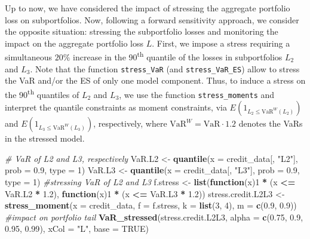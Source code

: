 \documentclass[
]{article}
\newenvironment{Shaded}{\begin{snugshade}}{\end{snugshade}}
\newcommand{\CommentTok}[1]{\textcolor[rgb]{0.56,0.35,0.01}{\textit{#1}}}
\newcommand{\ControlFlowTok}[1]{\textcolor[rgb]{0.13,0.29,0.53}{\textbf{#1}}}
\newcommand{\DataTypeTok}[1]{\textcolor[rgb]{0.13,0.29,0.53}{#1}}
\newcommand{\DecValTok}[1]{\textcolor[rgb]{0.00,0.00,0.81}{#1}}
\newcommand{\FloatTok}[1]{\textcolor[rgb]{0.00,0.00,0.81}{#1}}
\newcommand{\KeywordTok}[1]{\textcolor[rgb]{0.13,0.29,0.53}{\textbf{#1}}}
\newcommand{\NormalTok}[1]{#1}
\newcommand{\OperatorTok}[1]{\textcolor[rgb]{0.81,0.36,0.00}{\textbf{#1}}}
\newcommand{\OtherTok}[1]{\textcolor[rgb]{0.56,0.35,0.01}{#1}}
\newcommand{\StringTok}[1]{\textcolor[rgb]{0.31,0.60,0.02}{#1}}
\begin{document}
Up to now, we have considered the impact of stressing the aggregate portfolio loss on subportfolios. Now, following a forward sensitivity approach, we consider the opposite situation: stressing the subportfolio losses and monitoring the impact on the aggregate portfolio loss \(L\). First, we impose a stress requiring a simultaneous \(20\%\) increase in the 90\textsuperscript{th} quantile of the losses in subportfolios \(L_2\) and \(L_3\). Note that the function \texttt{stress\_VaR} (and \texttt{stress\_VaR\_ES}) allow to stress the VaR and/or the ES of only one model component. Thus, to induce a stress on the 90\textsuperscript{th} quantiles of \(L_2\) and \(L_3\), we use the function \texttt{stress\_moments} and interpret the quantile constraints as moment constraints, via \(E(1_{L_2 \leq \text{VaR}^W(L_2)})\) and \(E(1_{L_3 \leq \text{VaR}^W(L_3)})\), respectively, where \(\text{VaR}^W = \text{VaR} \cdot 1.2\) denotes the VaRs in the stressed model.

\begin{Shaded}
\begin{Highlighting}[]
\CommentTok{# VaR of L2 and L3, respectively}
\NormalTok{VaR.L2 <-}\StringTok{ }\KeywordTok{quantile}\NormalTok{(}\DataTypeTok{x =}\NormalTok{ credit_data[, }\StringTok{"L2"}\NormalTok{], }\DataTypeTok{prob =} \FloatTok{0.9}\NormalTok{, }\DataTypeTok{type =} \DecValTok{1}\NormalTok{) }
\NormalTok{VaR.L3 <-}\StringTok{ }\KeywordTok{quantile}\NormalTok{(}\DataTypeTok{x =}\NormalTok{ credit_data[, }\StringTok{"L3"}\NormalTok{], }\DataTypeTok{prob =} \FloatTok{0.9}\NormalTok{, }\DataTypeTok{type =} \DecValTok{1}\NormalTok{) }
\CommentTok{#stressing VaR of L2 and L3}
\NormalTok{f.stress <-}\StringTok{ }\KeywordTok{list}\NormalTok{(}\ControlFlowTok{function}\NormalTok{(x)}\DecValTok{1} \OperatorTok{*}\StringTok{ }\NormalTok{(x }\OperatorTok{<=}\StringTok{ }\NormalTok{VaR.L2 }\OperatorTok{*}\StringTok{ }\FloatTok{1.2}\NormalTok{), }
                 \ControlFlowTok{function}\NormalTok{(x)}\DecValTok{1} \OperatorTok{*}\StringTok{ }\NormalTok{(x }\OperatorTok{<=}\StringTok{ }\NormalTok{VaR.L3 }\OperatorTok{*}\StringTok{ }\FloatTok{1.2}\NormalTok{)) }
\NormalTok{stress.credit.L2L3 <-}\StringTok{ }\KeywordTok{stress_moment}\NormalTok{(}\DataTypeTok{x =}\NormalTok{ credit_data, }\DataTypeTok{f =}\NormalTok{ f.stress, }\DataTypeTok{k =} \KeywordTok{list}\NormalTok{(}\DecValTok{3}\NormalTok{, }\DecValTok{4}\NormalTok{), }
                                    \DataTypeTok{m =} \KeywordTok{c}\NormalTok{(}\FloatTok{0.9}\NormalTok{, }\FloatTok{0.9}\NormalTok{))}
\CommentTok{#impact on portfolio tail}
\KeywordTok{VaR_stressed}\NormalTok{(stress.credit.L2L3, }\DataTypeTok{alpha =} \KeywordTok{c}\NormalTok{(}\FloatTok{0.75}\NormalTok{, }\FloatTok{0.9}\NormalTok{, }\FloatTok{0.95}\NormalTok{, }\FloatTok{0.99}\NormalTok{), }\DataTypeTok{xCol =} \StringTok{"L"}\NormalTok{, }
             \DataTypeTok{base =} \OtherTok{TRUE}\NormalTok{)}
\end{Highlighting}
\end{Shaded}
\end{document}
